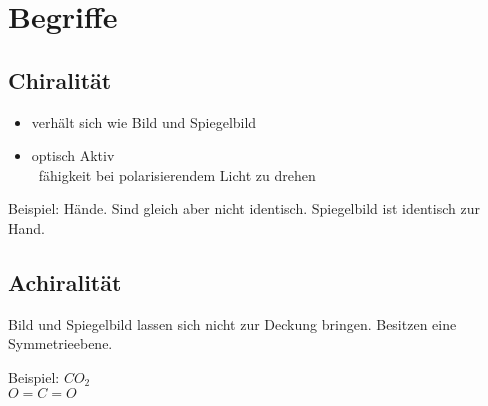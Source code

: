 
\section{Begriffe} \label{sec:begriffe}


\subsection{Chiralität} \label{sec:chiral}
\begin{itemize}
    \item verhält sich wie Bild und Spiegelbild
    \item optisch Aktiv \\
        \textrightarrow\ fähigkeit bei polarisierendem Licht zu drehen
\end{itemize}

Beispiel:
Hände. Sind gleich aber nicht identisch. Spiegelbild ist identisch zur Hand.

\subsection{Achiralität}
Bild und Spiegelbild lassen sich nicht zur Deckung bringen. Besitzen eine Symmetrieebene. 

Beispiel:
$CO_2$ \\
$O = C = O$

